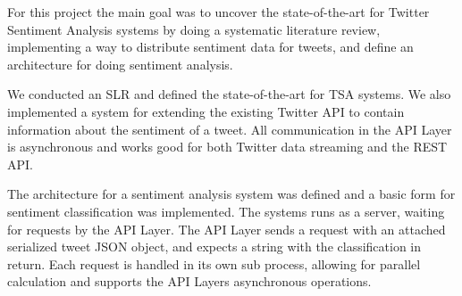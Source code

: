 For this project the main goal was to uncover the state-of-the-art for Twitter Sentiment Analysis systems by doing a systematic literature review, implementing a way to distribute sentiment data for tweets, and define an architecture for doing sentiment analysis. 

We conducted an SLR and defined the state-of-the-art for TSA systems. We also implemented a system for extending the existing Twitter API to contain information about the sentiment of a tweet. All communication in the API Layer is asynchronous and works good for both Twitter data streaming and the REST API. 

The architecture for a sentiment analysis system was defined and a basic form for sentiment classification was implemented. The systems runs as a server, waiting for requests by the API Layer. The API Layer sends a request with an attached serialized tweet JSON object, and expects a string with the classification in return. Each request is handled in its own sub process, allowing for parallel calculation and supports the API Layers asynchronous operations. 